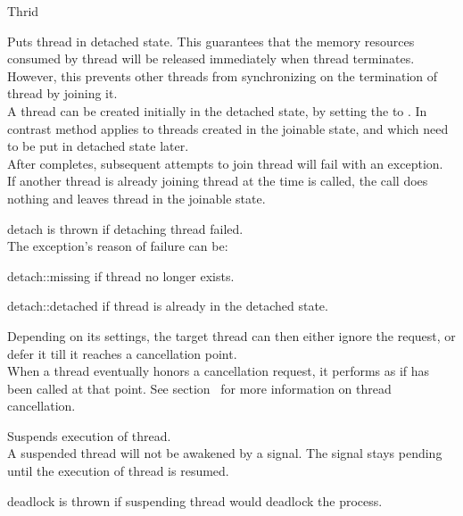 \begin{classpage}{Thrid}
\begin{mandescription}
  Puts  thread in detached state.
  This guarantees that the memory resources consumed by  thread will be released immediately when  thread terminates. 
  However, this prevents other threads from synchronizing on the termination of  thread by joining it.
  \\
  A thread can be created initially in the detached state, by setting the  to .
  In contrast method  applies to threads created in the joinable state, and which need to be put in detached state later.
  \\
  After  completes, subsequent attempts to join  thread will fail with an exception.
  \\
  If another thread is already joining  thread at the time  is called, the call does nothing and leaves  thread in the joinable state.
  \begin{exception}
    \item[detach] is thrown if detaching  thread failed.
      \\
      The exception's reason of failure can be:
      \begin{exreason}
        \item[detach::missing] if  thread no longer exists.
        \item[detach::detached] if  thread is already in the detached state.
      \end{exreason}
  \end{exception}

  Depending on its settings, the target thread can then either ignore the request, or defer it till it reaches a cancellation point.
  \\
  When a thread eventually honors a cancellation request, it performs as if  has been called at that point. 
  See section~ for more information on thread cancellation.

  Suspends execution of  thread.
  \\
  A suspended thread will not be awakened by a signal. 
  The signal stays pending until the execution of  thread is resumed.
  \begin{exception}
    \item[deadlock] is thrown if suspending
       thread would deadlock the process.
  \end{exception}


\end{mandescription}
\end{classpage}
